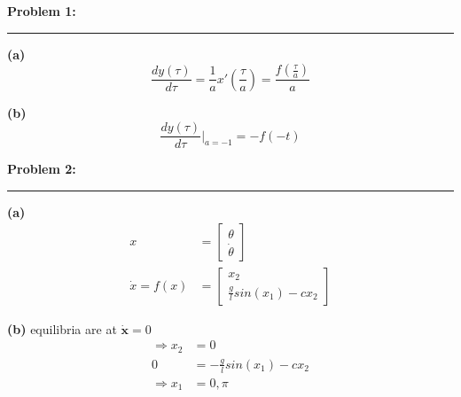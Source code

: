 \documentclass[11pt]{article}
\newcommand\question[2]{\vspace{.25in}\textbf{#1: #2}\vspace{.5em}\hrule\vspace{.10in}}
\renewcommand\part[1]{\vspace{.10in}\textbf{(#1)}}
\begin{document}
\raggedright

\question{Problem 1}{} 

\part{a} 
\begin{equation*}
\frac{dy(\tau)}{d\tau} = \frac{1}{a}x'\left( \frac{\tau}{a} \right) = \frac{f\left( \frac{\tau}{a} \right)}{a}
\end{equation*}

\part{b}
\begin{equation*}
\frac{dy(\tau)}{d\tau}\Bigr|_{a=-1} = -f(-t)
\end{equation*}

\question{Problem 2}{}
\part{a}
\begin{align*}
x &= 
\begin{bmatrix}
\theta \\
\dot{\theta}
\end{bmatrix} \\
\dot{x} = f(x)  &= 
\begin{bmatrix}
x_2 \\
\frac{g}{l}sin(x_1) - cx_2
\end{bmatrix}
\end{align*}

\part{b} equilibria are at $\mathbf{\dot{x}} = 0$
\begin{align*}
\Rightarrow x_2 &= 0 \\
0 &= -\frac{g}{l}sin(x_1) - cx_2 \\
\Rightarrow x_1 &= 0, \pi
\end{align*}
\end{document}
